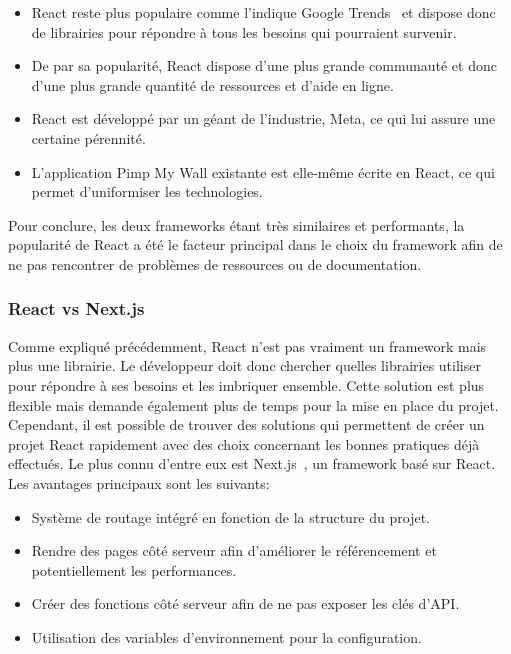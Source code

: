 \begin{itemize}
  \item React reste plus populaire comme l'indique Google Trends~\cite{google-trends-js-frameworks} et dispose donc de librairies pour répondre à tous les besoins qui pourraient survenir.
  \item De par sa popularité, React dispose d'une plus grande communauté et donc d'une plus grande quantité de ressources et d'aide en ligne.
  \item React est développé par un géant de l'industrie, Meta, ce qui lui assure une certaine pérennité.
  \item L'application Pimp My Wall existante est elle-même écrite en React, ce qui permet d'uniformiser les technologies.
\end{itemize}

Pour conclure, les deux frameworks étant très similaires et performants, la popularité de React a été le facteur principal dans le choix du framework afin de ne pas rencontrer de problèmes de ressources ou de documentation.

\subsubsection{React vs Next.js}

Comme expliqué précédemment, React n'est pas vraiment un framework mais plus une librairie. Le développeur doit donc chercher quelles librairies utiliser pour répondre à ses besoins et les imbriquer ensemble. Cette solution est plus flexible mais demande également plus de temps pour la mise en place du projet. Cependant, il est possible de trouver des solutions qui permettent de créer un projet React rapidement avec des choix concernant les bonnes pratiques déjà effectués. Le plus connu d'entre eux est Next.js~\cite{nextjs}, un framework basé sur React. Les avantages principaux sont les suivants:

\begin{itemize}
  \item Système de routage intégré en fonction de la structure du projet.
  \item Rendre des pages côté serveur afin d'améliorer le référencement et potentiellement les performances.
  \item Créer des fonctions côté serveur afin de ne pas exposer les clés d'API.
  \item Utilisation des variables d'environnement pour la configuration.
\end{itemize}


